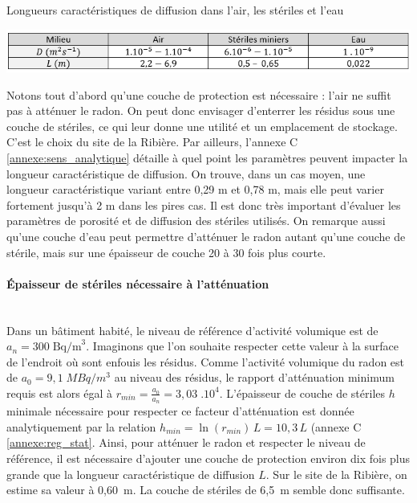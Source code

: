 \documentclass{article}
\begin{document}
\begin{table}[H]
    \centering
    \caption{Longueurs caractéristiques de diffusion dans l'air, les stériles et l'eau}
    \includegraphics[width = \linewidth]{III_C_2.png}
    \label{tab:longueur_diffusion}
\end{table}

Notons tout d’abord qu’une couche de protection est nécessaire : l’air ne suffit pas à atténuer le radon. On peut donc envisager d’enterrer les résidus sous une couche de stériles, ce qui leur donne une utilité et un emplacement de stockage. C'est le choix du site de la Ribière. Par ailleurs, l'annexe C \ref{annexe:sens_analytique} détaille à quel point les paramètres peuvent impacter la longueur caractéristique de diffusion. On trouve, dans un cas moyen, une longueur caractéristique variant entre 0,29 m et 0,78 m, mais elle peut varier fortement jusqu'à 2 m dans les pires cas. Il est donc très important d'évaluer les paramètres de porosité et de diffusion des stériles utilisés. On remarque aussi qu’une couche d’eau peut permettre d’atténuer le radon autant qu’une couche de stérile, mais sur une épaisseur de couche 20 à 30 fois plus courte.

\paragraph{Épaisseur de stériles nécessaire à l'atténuation \\ \\}
Dans un bâtiment habité, le niveau de référence d’activité volumique est de $a_n=300 \; \text{Bq/m}^3$. Imaginons que l’on souhaite respecter cette valeur à la surface de l’endroit où sont enfouis les résidus. Comme l'activité volumique du radon est de $a_0=9,1 \; M Bq/m^3$ au niveau des résidus, le rapport d’atténuation minimum requis est alors égal à $r_{min}=\frac{a_0}{a_n} =3,03 \; .10^4$. L’épaisseur de couche de stériles $h$ minimale nécessaire pour respecter ce facteur d’atténuation est donnée analytiquement par la relation $h_{min}=\ln(r_{min}) \,L =10,3 \,L $ (annexe C \ref{annexe:reg_stat}. Ainsi, pour atténuer le radon et respecter le niveau de référence, il est nécessaire d’ajouter une couche de protection environ dix fois plus grande que la longueur caractéristique de diffusion $L$. Sur le site de la Ribière, on estime sa valeur à 0,60~m. La couche de stériles de 6,5~m semble donc suffisante.
\end{document}
